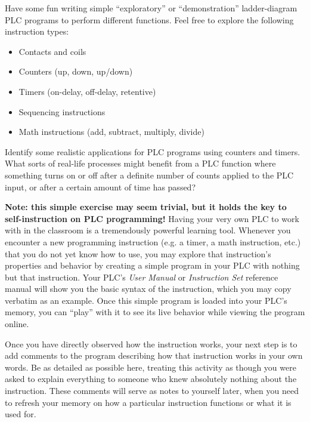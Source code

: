 

Have some fun writing simple ``exploratory'' or ``demonstration'' ladder-diagram PLC programs to perform different functions.  Feel free to explore the following instruction types:

\begin{itemize}
\item{} Contacts and coils
\item{} Counters (up, down, up/down)
\item{} Timers (on-delay, off-delay, retentive)
\item{} Sequencing instructions
\item{} Math instructions (add, subtract, multiply, divide)
\end{itemize}

Identify some realistic applications for PLC programs using counters and timers.  What sorts of real-life processes might benefit from a PLC function where something turns on or off after a definite number of counts applied to the PLC input, or after a certain amount of time has passed?

\vskip 10pt

{\bf Note: this simple exercise may seem trivial, but it holds the key to self-instruction on PLC programming!}  Having your very own PLC to work with in the classroom is a tremendously powerful learning tool.  Whenever you encounter a new programming instruction (e.g. a timer, a math instruction, etc.) that you do not yet know how to use, you may explore that instruction's properties and behavior by creating a simple program in your PLC with nothing but that instruction.  Your PLC's {\it User Manual} or {\it Instruction Set} reference manual will show you the basic syntax of the instruction, which you may copy verbatim as an example.  Once this simple program is loaded into your PLC's memory, you can ``play'' with it to see its live behavior while viewing the program online.

Once you have directly observed how the instruction works, your next step is to add comments to the program describing how that instruction works in your own words.  Be as detailed as possible here, treating this activity as though you were asked to explain everything to someone who knew absolutely nothing about the instruction.  These comments will serve as notes to yourself later, when you need to refresh your memory on how a particular instruction functions or what it is used for.

